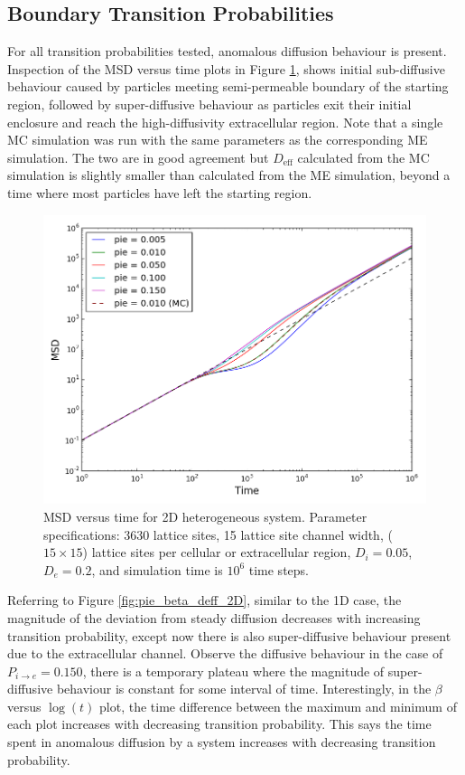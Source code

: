 \clearpage
\subsection{Boundary Transition Probabilities}
\label{sec:2D-boundary-transition-probabilities}

	For all transition probabilities tested, anomalous diffusion behaviour is present. Inspection of the MSD versus time plots in Figure \ref{fig:pie_msd_2D}, shows initial sub-diffusive behaviour caused by particles meeting semi-permeable boundary of the starting region, followed by super-diffusive behaviour as particles exit their initial enclosure and reach the high-diffusivity extracellular region.  Note that a single MC simulation was run with the same parameters as the corresponding ME simulation. The two are in good agreement but $ D_\textrm{eff} $ calculated from the MC simulation is slightly smaller than calculated from the ME simulation, beyond a time where most particles have left the starting region.
	
	\begin{figure}[h!]
		\centering
		\includegraphics[width=1.0\linewidth]{../images/2D/pie_msd_2D}
		\caption{MSD versus time for 2D heterogeneous system. Parameter specifications: 3630 lattice sites, 15 lattice site channel width, ($ 15 \times 15 $) lattice sites per cellular or extracellular region, $ D_i = 0.05 $, $ D_e = 0.2 $, and simulation time is $ 10^6 $ time steps.}
		\label{fig:pie_msd_2D}
	\end{figure}
	
	Referring to Figure \ref{fig:pie_beta_deff_2D}, similar to the 1D case, the magnitude of the deviation from steady diffusion decreases with increasing transition probability, except now there is also super-diffusive behaviour present due to the extracellular channel. Observe the diffusive behaviour in the case of $ P_{i \rightarrow e}  = 0.150 $, there is a temporary plateau where the magnitude of super-diffusive behaviour is constant for some interval of time. Interestingly, in the $ \beta $ versus $ \log(t) $ plot, the time difference between the maximum and minimum of each plot increases with decreasing transition probability. This says the time spent in anomalous diffusion by a system increases with decreasing transition probability.
	

